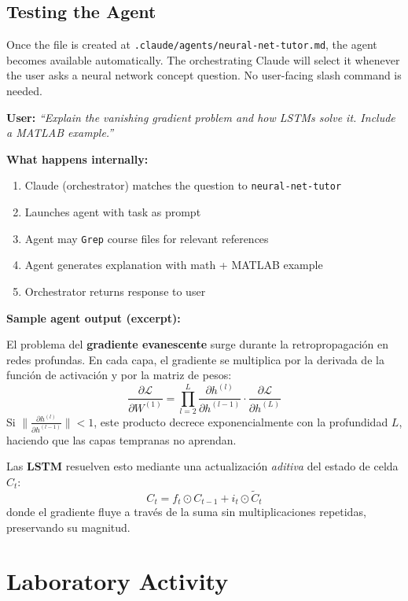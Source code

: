 \documentclass[11pt,letterpaper]{article}
\begin{document}
\subsection{Testing the Agent}

Once the file is created at \texttt{.claude/agents/neural-net-tutor.md}, the agent becomes available automatically. The orchestrating Claude will select it whenever the user asks a neural network concept question. No user-facing slash command is needed.

\begin{examplebox}[title=Test Interactions]

\textbf{User:} \textit{``Explain the vanishing gradient problem and how LSTMs solve it. Include a MATLAB example.''}

\textbf{What happens internally:}
\begin{enumerate}
    \item Claude (orchestrator) matches the question to \texttt{neural-net-tutor}
    \item Launches agent with task as prompt
    \item Agent may \texttt{Grep} course files for relevant references
    \item Agent generates explanation with math + MATLAB example
    \item Orchestrator returns response to user
\end{enumerate}

\textbf{Sample agent output (excerpt):}

El problema del \textbf{gradiente evanescente} surge durante la retropropagación en redes profundas. En cada capa, el gradiente se multiplica por la derivada de la función de activación y por la matriz de pesos:
$$\frac{\partial \mathcal{L}}{\partial W^{(1)}} = \prod_{l=2}^{L} \frac{\partial h^{(l)}}{\partial h^{(l-1)}} \cdot \frac{\partial \mathcal{L}}{\partial h^{(L)}}$$
Si $\|\frac{\partial h^{(l)}}{\partial h^{(l-1)}}\| < 1$, este producto decrece exponencialmente con la profundidad $L$, haciendo que las capas tempranas no aprendan.

Las \textbf{LSTM} resuelven esto mediante una actualización \emph{aditiva} del estado de celda $C_t$:
$$C_t = f_t \odot C_{t-1} + i_t \odot \tilde{C}_t$$
donde el gradiente fluye a través de la suma sin multiplicaciones repetidas, preservando su magnitud.
\end{examplebox}

\section{Laboratory Activity}
\end{document}

